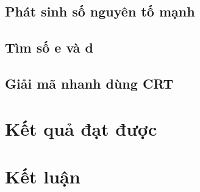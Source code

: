\documentclass[12pt]{article}
\begin{document}
\subsection{Phát sinh số nguyên tố mạnh}


\subsection{Tìm số e và d}


\subsection{Giải mã nhanh dùng CRT}


\section{Kết quả đạt được}


\section{Kết luận}



\newpage\cleardoublepage
\nocite{*}
\newpage\cleardoublepage

\end{document}
